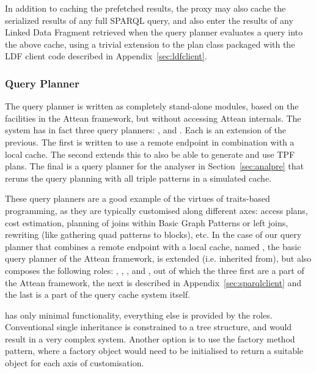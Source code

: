 In addition to caching the prefetched results, the proxy may also
cache the serialized results of any full SPARQL query, and also enter
the results of any Linked Data Fragment retrieved when the query
planner evaluates a query into the above cache, using a trivial
extension to the plan class packaged with the LDF client code
described in Appendix~\ref{sec:ldfclient}.



\subsubsection{Query Planner}\label{sec:implqueryplan}

The query planner is written as completely stand-alone modules, based
on the facilities in the Attean framework, but without accessing
Attean internals. The system has in fact three query planners:
,
 and
. Each is an
extension of the previous. The first is written to use a remote
endpoint in combination with a local cache. The second extends this to
also be able to generate and use TPF plans. The
final is a query planner for the analyser in Section~\ref{sec:analpre}
that reruns the query planning with all triple patterns in a simulated
cache.

These query planners are a good example of the virtues of traits-based
programming, as they are typically customised along different axes:
access plans, cost estimation, planning of joins within Basic Graph
Patterns or left joins, rewriting (like gathering quad patterns to
blocks), etc. In the case of our query planner that combines a remote
endpoint with a local cache, named
, the basic query planner of the
Attean framework,  is extended
(i.e. inherited from), but also composes the following roles:
,
,
,
 and
, out of which the three
first are a part of the Attean framework, the next is described in
Appendix~\ref{sec:sparqlclient} and the last is a part of the
query cache system itself.


 has only minimal functionality,
everything else is provided by the roles. Conventional single
inheritance is constrained to a tree structure, and would result in a
very complex system. Another option is to use the factory method
pattern, where a factory object would need to be initialised to return
a suitable object for each axis of customisation. 

